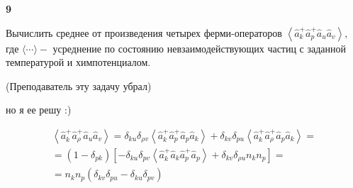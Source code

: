 \documentclass[a4paper,12pt]{article} %
\begin{document}
\begin{task} \textbf{9}
	
	
Вычислить среднее от произведения четырех ферми-операторов  
$\left\langle\hat{a}_{k}^{+} \hat{a}_{p}^{+} \hat{a}_{u} \hat{a}_{v}\right\rangle,$ 
где $\langle\cdots\rangle-$ усреднение по состоянию невзаимодействующих частиц с заданной температурой и химпотенциалом.

(Преподаватель эту задачу убрал)



но я ее решу :)




$$
\begin{array}{l}
	\left\langle\hat{a}_{k}^{+} \hat{a}_{\rho}^{+} \hat{a}_{u} \hat{a}_{v}\right\rangle=\delta_{k u} \delta_{\rho v}\left\langle\hat{a}_{k}^{+} \hat{a}_{p}^{+} \hat{a}_{p} \hat{a}_{k}\right\rangle+\delta_{k v} \delta_{p u}\left\langle\hat{a}_{k}^{+} \hat{a}_{\rho}^{+} \hat{a}_{p} \hat{a}_{k}\right\rangle= \\
	=\left(1-\delta_{p k}\right)\left[-\delta_{k u} \delta_{p v}\left\langle\hat{a}_{k}^{+} \hat{a}_{k} \hat{a}_{p}^{+} \hat{a}_{p}\right\rangle+\delta_{k v} \delta_{\rho u} n_{k} n_{p}\right]= \\
	=n_{k} n_{p}\left(\delta_{k v} \delta_{p u}-\delta_{k u} \delta_{p v}\right)
\end{array}
$$



















\end{task}
\end{document}

